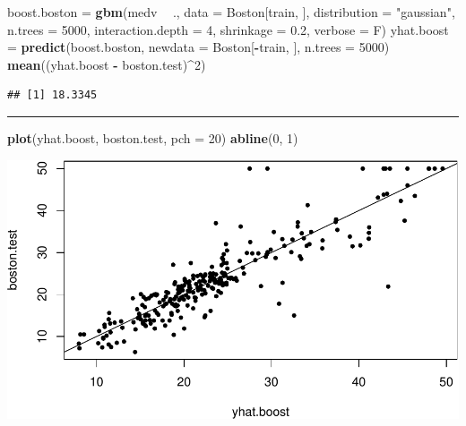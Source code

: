 \documentclass[]{article}
\newenvironment{Shaded}{\begin{snugshade}}{\end{snugshade}}
\newcommand{\DataTypeTok}[1]{\textcolor[rgb]{0.13,0.29,0.53}{#1}}
\newcommand{\DecValTok}[1]{\textcolor[rgb]{0.00,0.00,0.81}{#1}}
\newcommand{\FloatTok}[1]{\textcolor[rgb]{0.00,0.00,0.81}{#1}}
\newcommand{\KeywordTok}[1]{\textcolor[rgb]{0.13,0.29,0.53}{\textbf{#1}}}
\newcommand{\NormalTok}[1]{#1}
\newcommand{\OperatorTok}[1]{\textcolor[rgb]{0.81,0.36,0.00}{\textbf{#1}}}
\newcommand{\StringTok}[1]{\textcolor[rgb]{0.31,0.60,0.02}{#1}}
\begin{document}
\begin{Shaded}
\begin{Highlighting}[]
\NormalTok{boost.boston =}\StringTok{ }\KeywordTok{gbm}\NormalTok{(medv }\OperatorTok{~}\StringTok{ }\NormalTok{., }\DataTypeTok{data =}\NormalTok{ Boston[train, ], }\DataTypeTok{distribution =} \StringTok{"gaussian"}\NormalTok{, }
    \DataTypeTok{n.trees =} \DecValTok{5000}\NormalTok{, }\DataTypeTok{interaction.depth =} \DecValTok{4}\NormalTok{, }\DataTypeTok{shrinkage =} \FloatTok{0.2}\NormalTok{, }\DataTypeTok{verbose =}\NormalTok{ F)}
\NormalTok{yhat.boost =}\StringTok{ }\KeywordTok{predict}\NormalTok{(boost.boston, }\DataTypeTok{newdata =}\NormalTok{ Boston[}\OperatorTok{-}\NormalTok{train, ], }\DataTypeTok{n.trees =} \DecValTok{5000}\NormalTok{)}
\KeywordTok{mean}\NormalTok{((yhat.boost }\OperatorTok{-}\StringTok{ }\NormalTok{boston.test)}\OperatorTok{^}\DecValTok{2}\NormalTok{)}
\end{Highlighting}
\end{Shaded}

\begin{verbatim}
## [1] 18.3345
\end{verbatim}

\begin{center}\rule{0.5\linewidth}{\linethickness}\end{center}

\begin{Shaded}
\begin{Highlighting}[]
\KeywordTok{plot}\NormalTok{(yhat.boost, boston.test, }\DataTypeTok{pch =} \DecValTok{20}\NormalTok{)}
\KeywordTok{abline}\NormalTok{(}\DecValTok{0}\NormalTok{, }\DecValTok{1}\NormalTok{)}
\end{Highlighting}
\end{Shaded}

\includegraphics{8Trees_files/figure-latex/unnamed-chunk-50-1.pdf}
\end{document}
